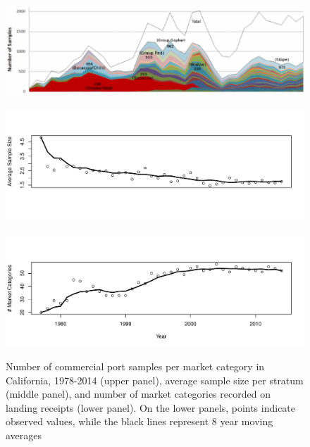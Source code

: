 \documentclass[12pt]{article}
\begin{document}
\begin{figure}[h!]
\centering
\includegraphics[width=\textwidth]{./pictures/mcatColors.png}
$~$\\
\vspace*{-2cm}
\hspace*{-0.3cm}
\includegraphics[width=1.055\textwidth]{./pictures/stratAvgSamp.pdf}
$~$\\
\vspace*{-3.8cm}
\hspace*{-0.3cm}
\includegraphics[width=1.055\textwidth]{./pictures/nMcatsEMA.pdf}
\caption{Number of commercial port samples per market
category in California, 1978-2014 (upper panel), average sample size per
stratum (middle panel), and number of market categories recorded on
landing receipts (lower panel). On the lower panels, points indicate
observed values, while the black lines represent 8 year moving averages}
\label{sparceData}
\end{figure}
\end{document}
